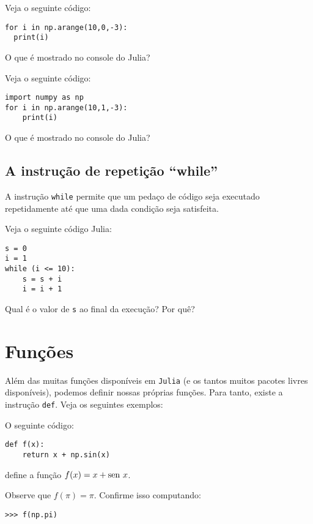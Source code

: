\begin{ex}
  Veja o seguinte código:
\begin{lstlisting}
for i in np.arange(10,0,-3):
  print(i)
\end{lstlisting}
O que é mostrado no console do Julia?
\end{ex}

\begin{ex}
  Veja o seguinte código:
\begin{lstlisting}
import numpy as np
for i in np.arange(10,1,-3):
    print(i)
\end{lstlisting}
O que é mostrado no console do Julia?
\end{ex}

\subsection{A instrução de repetição ``while''}

A instrução \verb+while+ permite que um pedaço de código seja executado repetidamente até que uma dada condição seja satisfeita.

\begin{ex}
Veja o seguinte código Julia:
\begin{lstlisting}
s = 0
i = 1
while (i <= 10):
    s = s + i
    i = i + 1
\end{lstlisting}
Qual é o valor de \verb+s+ ao final da execução? Por quê?
\end{ex}

\section{Funções}

Além das muitas funções disponíveis em \verb+Julia+ (e os tantos muitos pacotes livres disponíveis), podemos definir nossas próprias funções. Para tanto, existe a instrução \verb+def+. Veja os seguintes exemplos:

\begin{ex}
  O seguinte código:
\begin{lstlisting}
def f(x):
    return x + np.sin(x)
\end{lstlisting}
define a função $f(x) = x + \operatorname{sen}\, x$.

Observe que $f(\pi) = \pi$. Confirme isso computando:
\begin{lstlisting}
>>> f(np.pi)
\end{lstlisting}
\end{ex}

